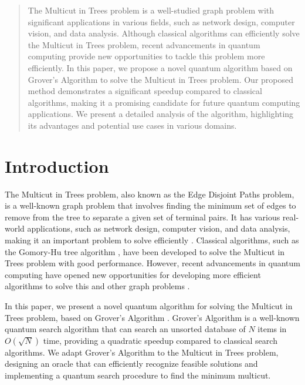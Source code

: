 \begin{abstract}

The Multicut in Trees problem is a well-studied graph problem with significant applications in various fields, such as network design, computer vision, and data analysis. Although classical algorithms can efficiently solve the Multicut in Trees problem, recent advancements in quantum computing provide new opportunities to tackle this problem more efficiently. In this paper, we propose a novel quantum algorithm based on Grover's Algorithm to solve the Multicut in Trees problem. Our proposed method demonstrates a significant speedup compared to classical algorithms, making it a promising candidate for future quantum computing applications. We present a detailed analysis of the algorithm, highlighting its advantages and potential use cases in various domains.

\end{abstract}

\section{Introduction}

The Multicut in Trees problem, also known as the Edge Disjoint Paths problem, is a well-known graph problem that involves finding the minimum set of edges to remove from the tree to separate a given set of terminal pairs. It has various real-world applications, such as network design, computer vision, and data analysis, making it an important problem to solve efficiently \cite{garg1997primal, calinescu2000correlation}. Classical algorithms, such as the Gomory-Hu tree algorithm \cite{gomory1961multi}, have been developed to solve the Multicut in Trees problem with good performance. However, recent advancements in quantum computing have opened new opportunities for developing more efficient algorithms to solve this and other graph problems \cite{childs2019quantum}.

In this paper, we present a novel quantum algorithm for solving the Multicut in Trees problem, based on Grover's Algorithm \cite{grover1996fast}. Grover's Algorithm is a well-known quantum search algorithm that can search an unsorted database of $N$ items in $O(\sqrt{N})$ time, providing a quadratic speedup compared to classical search algorithms. We adapt Grover's Algorithm to the Multicut in Trees problem, designing an oracle that can efficiently recognize feasible solutions and implementing a quantum search procedure to find the minimum multicut.

